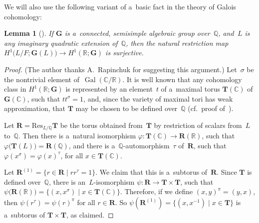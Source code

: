 \documentclass[11pt]{article}
\DeclareMathOperator{\Gal}{Gal}
\numberwithin{equation}{section}
\newtheorem{lem}[prop]{Lemma}
{\theoremstyle{definition}
\newtheorem{defn}[prop]{Definition}
\newtheorem{notation}[prop]{Notation}
\newtheorem{rem}[prop]{Remark}
\newtheorem{ques}[prop]{Question}
\newtheorem{eg}[prop]{Example}
\newtheorem{erratum}[prop]{Erratum}}
\begin{document}
We will also use the following variant of a~basic fact in the theory of Galois cohomology:

\begin{lem}[]\label{KneserHasse}
If $\mathbf{G}$ is a~connected, semisimple algebraic group over~$\mathbb{Q}$, and~$L$ is any imaginary quadratic
extension of~$\mathbb{Q}$, then the natural restriction map $H^1 \bigl(L/F; \mathbf{G}(L) \bigr) \to H^1 (\mathbb{R};
\mathbf{G})$ is surjective.
\end{lem}

\begin{proof}(The author thanks A.~Rapinchuk for suggesting this argument.) Let~$\sigma$ be the nontrivial element of~$\Gal(\mathbb{C}/\mathbb{R})$.
It is well known that any cohomology class in $H^1(\mathbb{R}; \mathbf{G})$ is represented by an element~$t$ of
a~maximal torus $\mathbf{T}(\mathbb{C})$ of $\mathbf{G}(\mathbb{C})$, such that $t t^\sigma = 1$, and, since the variety
of maximal tori has weak approximation, that $\mathbf{T}$ may be chosen to be def\/ined over~$\mathbb{Q}$ (cf.\ proof
of~\cite[Proposition~6.17, p.~337]{PlatonovRapinchukBook}).

Let $\mathbf{R} = \mathrm{Res}_{L/\mathbb{Q}} \mathbf{T}$ be the torus obtained from~$\mathbf{T}$ by restriction of
scalars from~$L$ to~$\mathbb{Q}$.
Then there is a~natural isomorphism $\varphi \colon \mathbf{T}(\mathbb{C}) \to \mathbf{R}(\mathbb{R})$, such that
$\varphi \bigl(\mathbf{T}(L) \bigr) = \mathbf{R}(\mathbb{Q})$, and there is a~$\mathbb{Q}$-automorphism~$\tau$
of~$\mathbf{R}$, such that $\varphi(x^\sigma) = \varphi(x)^\tau$, for all $x \in \mathbf{T}(\mathbb{C})$.

Let $\mathbf{R}^{(1)} = \{ r \in \mathbf{R} \mid r r^\tau = 1 \}$.
We claim that this is a~subtorus of~$\mathbf{R}$.
Since $\mathbf{T}$ is def\/ined over~$\mathbb{Q}$, there is an~$L$-isomorphism $\psi \colon \mathbf{R} \to \mathbf{T}
\times \mathbf{T}$, such that $\psi \bigl(\mathbf{R}(\mathbb{R}) \bigr) = \{ (x, x^\sigma) \mid x \in
\mathbf{T}(\mathbb{C}) \}$.
Therefore, if we def\/ine $(x,y)^\pi = (y,x)$, then $\psi(r^\tau) = \psi(r)^\pi$ for all $r \in \mathbf{R}$.
So $\psi(\mathbf{R}^{(1)}) = \{ (x, x^{-1}) \mid x \in \mathbf{T} \}$ is a~subtorus of $\mathbf{T} \times \mathbf{T}$,
as claimed.


\end{proof}
\end{document}
